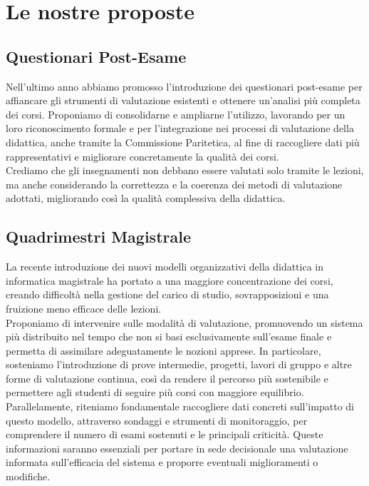 \documentclass[12pt,a4paper]{article}
\begin{document}
\section{Le nostre proposte}

\subsection{Questionari Post-Esame}
Nell’ultimo anno abbiamo promosso l’introduzione dei questionari post-esame per affiancare gli strumenti di valutazione esistenti e ottenere un’analisi più completa dei corsi. Proponiamo di consolidarne e ampliarne l’utilizzo, lavorando per un loro riconoscimento formale e per l’integrazione nei processi di valutazione della didattica, anche tramite la Commissione Paritetica, al fine di raccogliere dati più rappresentativi e migliorare concretamente la qualità dei corsi.\\Crediamo che gli insegnamenti non debbano essere valutati solo tramite le lezioni, ma anche considerando la correttezza e la coerenza dei metodi di valutazione adottati, migliorando così la qualità complessiva della didattica.

\subsection{Quadrimestri Magistrale}
La recente introduzione dei nuovi modelli organizzativi della didattica in informatica magistrale ha portato a una maggiore concentrazione dei corsi, creando difficoltà nella gestione del carico di studio, sovrapposizioni e una fruizione meno efficace delle lezioni.
\\Proponiamo di intervenire sulle modalità di valutazione, promuovendo un sistema più distribuito nel tempo che non si basi esclusivamente sull’esame finale e permetta di assimilare adeguatamente le nozioni apprese. In particolare, sosteniamo l’introduzione di prove intermedie, progetti, lavori di gruppo e altre forme di valutazione continua, così da rendere il percorso più sostenibile e permettere agli studenti di seguire più corsi con maggiore equilibrio.
\\Parallelamente, riteniamo fondamentale raccogliere dati concreti sull’impatto di questo modello, attraverso sondaggi e strumenti di monitoraggio, per comprendere il numero di esami sostenuti e le principali criticità. Queste informazioni saranno essenziali per portare in sede decisionale una valutazione informata sull’efficacia del sistema e proporre eventuali miglioramenti o modifiche.
\end{document}

